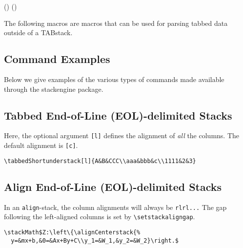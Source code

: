 \documentclass{article}
\begin{document}
\rmfamily\normalsize

\begin{verbnobox}[\footnotesize]
\TABunaryLeft    (\TABbinaryRight)
\TABunaryRight   (\TABbinaryLeft)
\TABbinary
\end{verbnobox}
The following macros are macros that can be used for parsing tabbed data outside of a
TABstack.
\begin{verbnobox}[\footnotesize]
\TABstackMath
\TABstackText
\ensureTABstackMath{}
\end{verbnobox}

\subsection{Command Examples}

Below we give examples of the various types of commands made available through
the \textsf{stackengine} package.

\subsection*{Tabbed End-of-Line (EOL)-delimited Stacks}

Here, the optional argument \verb|[l]| defines the alignment of \textit{all} the
columns.  The default alignment is \verb|[c]|.

\verb|\tabbedShortunderstack[l]{A&B&CCC\\aaa&bbb&c\\1111&2&3}|

{\small{}}

\subsection*{Align End-of-Line (EOL)-delimited Stacks}

In an \texttt{align}-stack, the column alignments will always be \verb|rlrl...|
The gap following the left-aligned columns is set by \verb|\setstackaligngap|.

\verb|\stackMath$Z:\left\{\alignCenterstack{%|\\
\verb|  y=&mx+b,&0=&Ax+By+C\\y_1=&W_1,&y_2=&W_2}\right.$|
\end{document}
